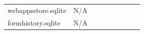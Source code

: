 \begin{appendices}
\begin{table}[h!]
{\begin{tabular}{|l|c|cc|cc|cc|cc|}
webappsstore.sqlite                                        & \cellcolor[HTML]{C0C0C0}N/A                                                                        & \multicolumn{1}{c|}{\cellcolor[HTML]{FFCE93}}                                                                                                           & \cellcolor[HTML]{FE996B}                                                                               & \multicolumn{1}{c|}{\cellcolor[HTML]{FE996B}}                                                                               & \cellcolor[HTML]{FE996B}                                                                               & \multicolumn{1}{c|}{\cellcolor[HTML]{FE996B}}                                                                               & \cellcolor[HTML]{FE996B}                                                                               & \multicolumn{2}{c|}{\cellcolor[HTML]{FE996B}}                                                                               \\ \cline{1-2}
formhistory.sqlite                                         & \cellcolor[HTML]{C0C0C0}N/A                                                                        & \multicolumn{1}{c|}{\cellcolor[HTML]{FFCE93}}                                                                                                           & \cellcolor[HTML]{FE996B}                                                                               & \multicolumn{1}{c|}{\cellcolor[HTML]{FE996B}}                                                                               & \cellcolor[HTML]{FE996B}                                                                               & \multicolumn{1}{c|}{\cellcolor[HTML]{FE996B}}                                                                               & \cellcolor[HTML]{FE996B}                                                                               & \multicolumn{2}{c|}{\cellcolor[HTML]{FE996B}}                                                                               \\ \cline{1-2}

\end{tabular}}
\end{table}
\end{appendices}
